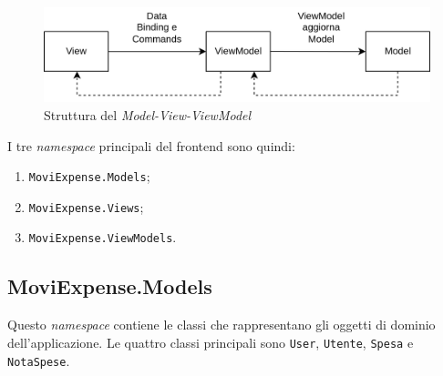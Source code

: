\begin{figure}[H]
    \centering 
    \includegraphics[width=.9\columnwidth]{images/MVVM.png} 
    \caption{Struttura del \emph{Model-View-ViewModel}}
\end{figure}

I tre \emph{namespace} principali del frontend sono quindi:
\begin{enumerate}
    \item \verb+MoviExpense.Models+;
    \item \verb+MoviExpense.Views+;
    \item \verb+MoviExpense.ViewModels+.
\end{enumerate}

\subsection{MoviExpense.Models}
\label{cap:model}

Questo \emph{namespace} contiene le classi che rappresentano gli oggetti di dominio dell'applicazione. Le quattro classi principali sono \verb+User+, \verb+Utente+, \verb+Spesa+ e \verb+NotaSpese+.

